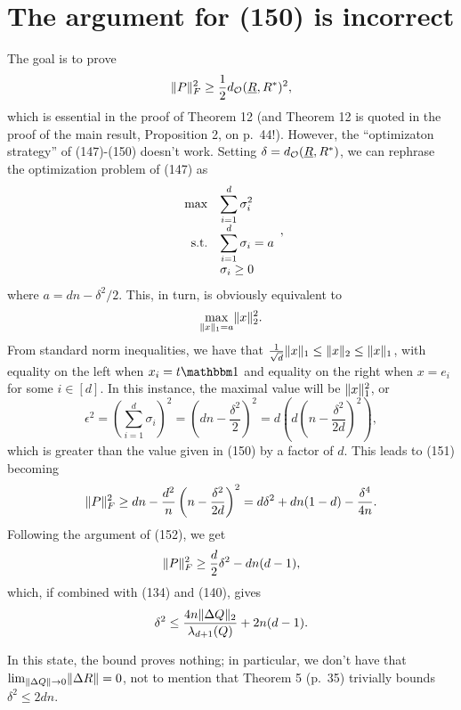 \documentclass[12pt]{article}
\begin{document}
\section{The argument for (150) is incorrect}
\label{sec:incorrect}
The goal is to prove \begin{equation} \lVert P\rVert_F^2 \ge \frac{1}{2} d_{\mathcal{O}}(\underline{R}, R^*)^2, \label{goal} \end{equation} which is essential in the proof of Theorem 12 (and Theorem 12 is quoted in the proof of the main result, Proposition 2, on p.~44!).  However, the ``optimizaton strategy'' of (147)-(150) doesn't work.  Setting $\delta = d_{\mathcal{O}}(\underline{R}, R^*)$, we can rephrase the optimization problem of (147) as
\[\begin{array}{r>{\displaystyle}l}
\max & \sum_{i = 1}^d \sigma_i^2 \\
\text{s.t.} & \sum_{i = 1}^d \sigma_i = a \\
& \sigma_i \ge 0
\end{array},
\]
where $a = dn - \delta^2 / 2$.  This, in turn, is obviously equivalent to \[\max_{\lVert x\rVert_1 = a} \lVert x\rVert_2^2.\]  From standard norm inequalities, we have that $\frac{1}{\sqrt{d}} \lVert x\rVert_1 \le \lVert x\rVert_2 \le \lVert x\rVert_1$, with equality on the left when $x_i = t \one$ and equality on the right when $x = e_i$ for some $i \in [d]$.  In this instance, the maximal value will be $\lVert x\rVert_1^2$, or \[\epsilon^2 = \left(\sum_{i = 1}^d \sigma_i\right)^2 = \left(dn - \frac{\delta^2}{2}\right)^2 = d \left(d\left(n - \frac{\delta^2}{2d}\right)^2\right),\] which is greater than the value given in (150) by a factor of $d$.  This leads to (151) becoming \[\lVert P\rVert_F^2 \ge dn - \frac{d^2}{n}\left(n - \frac{\delta^2}{2d}\right)^2 = d \delta^2 + dn(1 - d) - \frac{\delta^4}{4n}.\]  Following the argument of (152), we get \[\lVert P\rVert_F^2 \ge \frac{d}{2} \delta^2 - dn(d - 1),\] which, if combined with (134) and (140), gives \[\delta^2 \le \frac{4n \lVert\Delta Q\rVert_2}{\lambda_{d + 1}(Q)} + 2n(d - 1).\]  

In this state, the bound proves nothing; in particular, we don't have that $\lim_{\lVert\Delta Q\rVert \to 0} \lVert\Delta R\rVert = 0$, not to mention that Theorem 5 (p.~35) trivially bounds $\delta^2 \le 2dn$.
\end{document}
